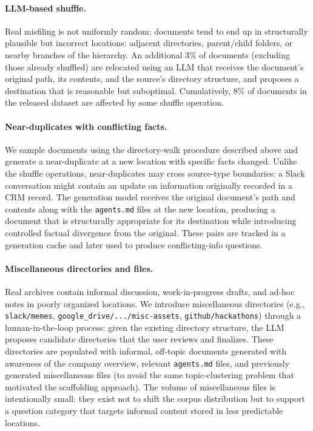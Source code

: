 \documentclass{article}
\begin{document}
\paragraph{LLM-based shuffle.}
Real misfiling is not uniformly random; documents tend to end up in structurally plausible but incorrect locations: adjacent directories, parent/child folders, or nearby branches of the hierarchy. An additional 3\% of documents (excluding those already shuffled) are relocated using an LLM that receives the document's original path, its contents, and the source's directory structure, and proposes a destination that is reasonable but suboptimal. Cumulatively, 8\% of documents in the released dataset are affected by some shuffle operation.

\paragraph{Near-duplicates with conflicting facts.}
We sample documents using the directory-walk procedure described above and generate a near-duplicate at a new location with specific facts changed. Unlike the shuffle operations, near-duplicates may cross source-type boundaries: a Slack conversation might contain an update on information originally recorded in a CRM record. The generation model receives the original document's path and contents along with the \texttt{agents.md} files at the new location, producing a document that is structurally appropriate for its destination while introducing controlled factual divergence from the original. These pairs are tracked in a generation cache and later used to produce conflicting-info questions.

\paragraph{Miscellaneous directories and files.}
Real archives contain informal discussion, work-in-progress drafts, and ad-hoc notes in poorly organized locations. We introduce miscellaneous directories (e.g., \texttt{slack/memes}, \texttt{google\_drive/.../misc-assets}, \texttt{github/hackathons}) through a human-in-the-loop process: given the existing directory structure, the LLM proposes candidate directories that the user reviews and finalizes. These directories are populated with informal, off-topic documents generated with awareness of the company overview, relevant \texttt{agents.md} files, and previously generated miscellaneous files (to avoid the same topic-clustering problem that motivated the scaffolding approach). The volume of miscellaneous files is intentionally small: they exist not to shift the corpus distribution but to support a question category that targets informal content stored in less predictable locations.
\end{document}
